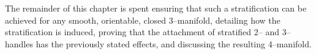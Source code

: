 The remainder of this chapter is spent ensuring that such a stratification can be achieved for any smooth, orientable, closed 3--manifold, detailing how the stratification is induced, proving that the attachment of stratified 2-- and 3--handles has the previously stated effects, and discussing the resulting 4--manifold.













